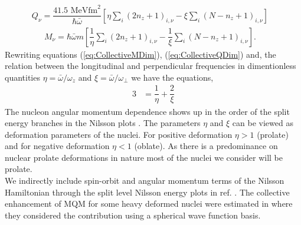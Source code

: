 \documentclass[10pt,a4paper, twoside, openright]{report}
\begin{document}
\begin{align}
Q_{\nu} = \dfrac{41.5\text{ MeV}\text{fm}^2}{\hbar\bar{\omega}}\left[\eta\sum_{i}\left(2n_z + 1\right)_{i,\nu}  - \xi\sum_{i}\left(N - n_z + 1\right)_{i,\nu}\right]&
\label{eq:QDimensionless}
\end{align}
\begin{align}
M_{\nu} = \hbar\bar{\omega}m\left[\dfrac{1}{\eta}\sum_{i}\left(2n_z + 1\right)_{i,\nu} - \dfrac{1}{\xi}\sum_{i}\left(N - n_z + 1\right)_{i,\nu}\right]. & \label{eq:MDimensionless}
\end{align}
Rewriting equations (\ref{eq:CollectiveMDim}), (\ref{eq:CollectiveQDim})  and, the relation between the longitudinal  and perpendicular frequencies in dimentionless quantities $\eta = \bar{\omega}/\omega_z$ and $\xi = \bar{\omega}/\omega_{\perp}$ we have the equations,
\begin{align}
3 &= \dfrac{1}{\eta} + \dfrac{2}{\xi} \label{eq:average} 
\end{align}
The nucleon angular momentum dependence shows up in the order of the split energy branches in the Nilsson plots \cite{Nilsson1955, BohrMottVol2}.
The parameters $\eta$ and $\xi$ can be viewed as deformation parameters of the nuclei. For positive deformation $\eta > 1$ (prolate) and for negative deformation $\eta < 1$ (oblate). As there is a predominance on nuclear prolate deformations in nature most of the nuclei we consider will be prolate. \\
\linebreak
We indirectly include spin-orbit and angular momentum terms of the Nilsson Hamiltonian through the split level Nilsson energy plots in ref. \cite{BohrMottVol2}.
The collective enhancement of MQM for some  heavy deformed nuclei were estimated in \cite{Flambaum1994, Flambaum2014} where they considered the contribution using a spherical wave function basis. 
\end{document}
